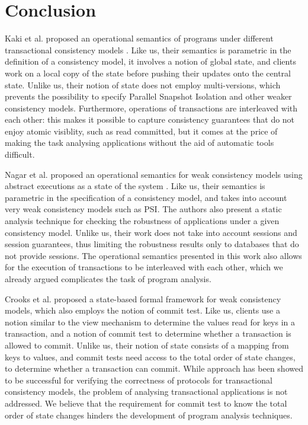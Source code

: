 \section{Conclusion}
 

Kaki et al. proposed an operational semantics of programs 
under different transactional consistency models \cite{alonetogether}. Like us, 
their semantics is parametric in the definition of a consistency model, it 
involves a notion of global state, 
and clients work on a local copy of the state 
before pushing their updates onto the central state. Unlike 
us, their notion of state does not employ multi-versions, 
which prevents the possibility to specify Parallel Snapshot Isolation 
and other weaker consistency models. 
Furthermore, operations of transactions are interleaved with each 
other: this makes it possible to capture consistency guarantees that 
do not enjoy atomic visiblity, such as read committed, but it comes 
at the price of making the task analysing applications without the aid 
of automatic tools difficult.

Nagar et al. proposed an operational semantics for weak consistency 
models using abstract executions as a state of the system \cite{sureshConcur}. 
Like us, their semantics is parametric in the specification of a consistency model, 
and takes into account very weak consistency models such as PSI. 
The authors also present a static analysis technique for checking the robustness of applications 
under a given consistency model. Unlike us, their work does not take into account 
sessions and session guarantees, thus limiting the robustness results only to databases 
that do not provide sessions. The 
operational semantics presented in this  work also allows for the execution of transactions to be interleaved 
with each other, which we already argued complicates the task of program analysis. 

Crooks et al. proposed a state-based formal framework for weak consistency models, 
which also employs the notion of commit test. Like us, clients use a notion similar 
to the view mechanism to determine the values read for keys in a transaction, 
and a notion of commit test to  determine whether a transaction is allowed to commit. 
Unlike us, their notion of state consists of a mapping from keys to values, and 
commit tests need access to the total order of state changes, to determine whether a transaction can commit.
While approach has been showed to be successful for verifying the correctness of protocols for transactional consistency models, 
the problem of analysing transactional applications is not addressed.
We believe that the requirement for commit test to know the total order 
of state changes hinders the development of program analysis techniques.

